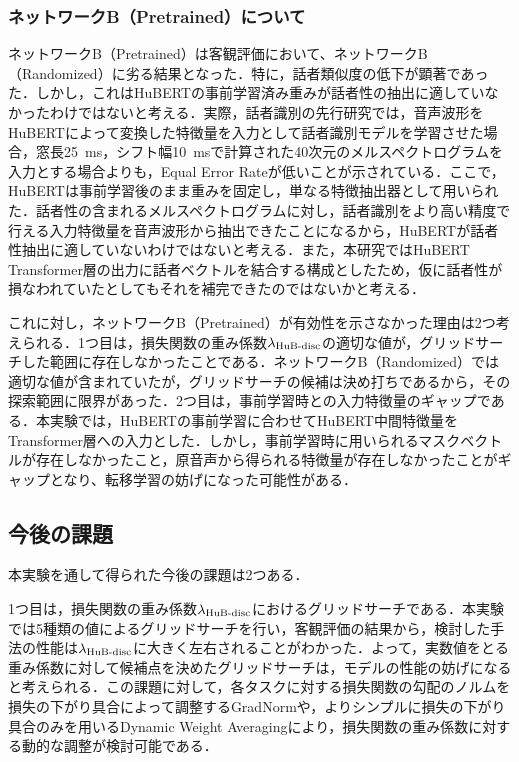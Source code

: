 \subsubsection{ネットワークB（Pretrained）について}
ネットワークB（Pretrained）は客観評価において、ネットワークB（Randomized）に劣る結果となった．特に，話者類似度の低下が顕著であった．しかし，これはHuBERTの事前学習済み重みが話者性の抽出に適していなかったわけではないと考える．実際，話者識別の先行研究\cite{chen2022large}では，音声波形をHuBERTによって変換した特徴量を入力として話者識別モデルを学習させた場合，窓長\SI{25}{\ms}，シフト幅\SI{10}{\ms}で計算された40次元のメルスペクトログラムを入力とする場合よりも，Equal Error Rateが低いことが示されている．ここで，HuBERTは事前学習後のまま重みを固定し，単なる特徴抽出器として用いられた．話者性の含まれるメルスペクトログラムに対し，話者識別をより高い精度で行える入力特徴量を音声波形から抽出できたことになるから，HuBERTが話者性抽出に適していないわけではないと考える．また，本研究ではHuBERT Transformer層の出力に話者ベクトルを結合する構成としたため，仮に話者性が損なわれていたとしてもそれを補完できたのではないかと考える．

これに対し，ネットワークB（Pretrained）が有効性を示さなかった理由は2つ考えられる．1つ目は，損失関数の重み係数$\lambda_{\text{HuB-disc}}$の適切な値が，グリッドサーチした範囲に存在しなかったことである．ネットワークB（Randomized）では適切な値が含まれていたが，グリッドサーチの候補は決め打ちであるから，その探索範囲に限界があった．2つ目は，事前学習時との入力特徴量のギャップである．本実験では，HuBERTの事前学習に合わせてHuBERT中間特徴量をTransformer層への入力とした．しかし，事前学習時に用いられるマスクベクトルが存在しなかったこと，原音声から得られる特徴量が存在しなかったことがギャップとなり、転移学習の妨げになった可能性がある．

\subsection{今後の課題}
本実験を通して得られた今後の課題は2つある．

1つ目は，損失関数の重み係数$\lambda_{\text{HuB-disc}}$におけるグリッドサーチである．本実験では5種類の値によるグリッドサーチを行い，客観評価の結果から，検討した手法の性能は$\lambda_{\text{HuB-disc}}$に大きく左右されることがわかった．よって，実数値をとる重み係数に対して候補点を決めたグリッドサーチは，モデルの性能の妨げになると考えられる．この課題に対して，各タスクに対する損失関数の勾配のノルムを損失の下がり具合によって調整するGradNorm\cite{chen2018gradnorm}や，よりシンプルに損失の下がり具合のみを用いるDynamic Weight Averaging\cite{liu2019end}により，損失関数の重み係数に対する動的な調整が検討可能である．


